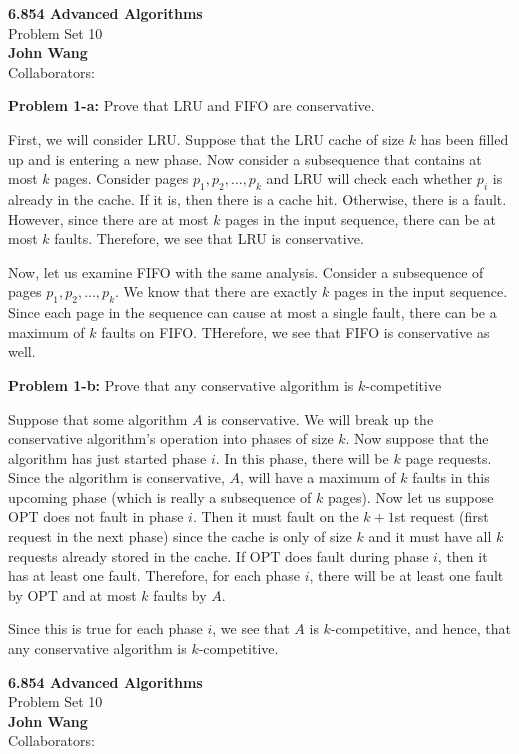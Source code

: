 \documentclass[psamsfonts]{amsart}
\newenvironment{sol}{\vspace{0.25cm}{\large \bfseries Solution:}}{\qedsymbol}
\newenvironment{prob}[1]{\begin{framed}{\large \bfseries Problem #1:}}{\end{framed}}
\newcommand{\makenewtitle}{
    \begin{center}
    {\huge \bfseries 6.854 Advanced Algorithms} \\
    Problem Set 10\\
    \vspace{0.25cm}
    {\bfseries John Wang} \\
    Collaborators:  
    \end{center}
    \vspace{0.5cm}
}
\begin{document}
\makenewtitle

\begin{prob}{1-a}
Prove that LRU and FIFO are conservative.
\end{prob}
\begin{sol}
First, we will consider LRU. Suppose that the LRU cache of size $k$ has been filled up and is entering a new phase. Now consider a subsequence that contains at most $k$ pages. Consider pages $p_1, p_2, \ldots, p_k$ and LRU will check each whether $p_i$ is already in the cache. If it is, then there is a cache hit. Otherwise, there is a fault. However, since there are at most $k$ pages in the input sequence, there can be at most $k$ faults. Therefore, we see that LRU is conservative.

Now, let us examine FIFO with the same analysis. Consider a subsequence of pages $p_1, p_2, \ldots, p_k$. We know that there are exactly $k$ pages in the input sequence. Since each page in the sequence can cause at most a single fault, there can be a maximum of $k$ faults on FIFO. THerefore, we see that FIFO is conservative as well.
\end{sol}

\begin{prob}{1-b}
Prove that any conservative algorithm is $k$-competitive
\end{prob}
\begin{sol}
Suppose that some algorithm $A$ is conservative. We will break up the conservative algorithm's operation into phases of size $k$. Now suppose that the algorithm has just started phase $i$. In this phase, there will be $k$ page requests. Since the algorithm is conservative, $A$, will have a maximum of $k$ faults in this upcoming phase (which is really a subsequence of $k$ pages). Now let us suppose OPT does not fault in phase $i$. Then it must fault on the $k+1$st request (first request in the next phase) since the cache is only of size $k$ and it must have all $k$ requests already stored in the cache. If OPT does fault during phase $i$, then it has at least one fault. Therefore, for each phase $i$, there will be at least one fault by OPT and at most $k$ faults by $A$. 

Since this is true for each phase $i$, we see that $A$ is $k$-competitive, and hence, that any conservative algorithm is $k$-competitive.
\end{sol}

\newpage
\makenewtitle
\end{document}
